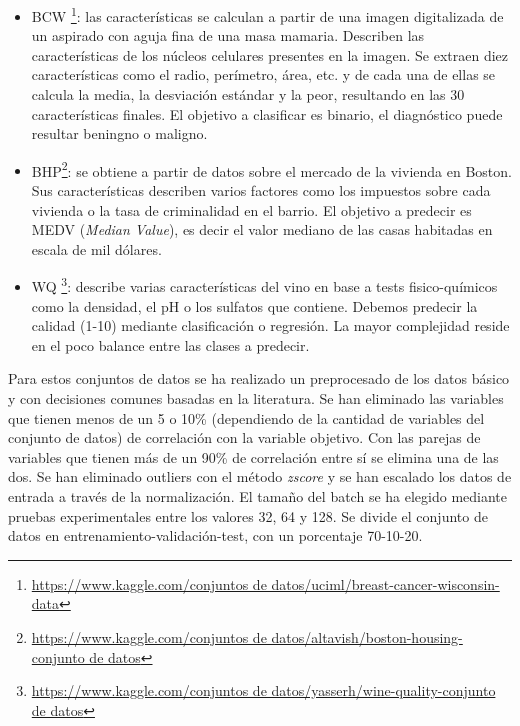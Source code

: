 \begin{itemize}

\item BCW \footnote{\url{https://www.kaggle.com/conjuntos de datos/uciml/breast-cancer-wisconsin-data}}: las características se calculan a partir de una imagen digitalizada de un aspirado con aguja fina de una masa mamaria. Describen las características de los núcleos celulares presentes en la imagen. Se extraen diez características como el radio, perímetro, área, etc. y de cada una de ellas se calcula la media, la desviación estándar y la peor, resultando en las 30 características finales. El objetivo a clasificar es binario, el diagnóstico puede resultar beningno o maligno. 

\item BHP\footnote{\url{https://www.kaggle.com/conjuntos de datos/altavish/boston-housing-conjunto de datos}}: se obtiene a partir de datos sobre el mercado de la vivienda en Boston. Sus características describen varios factores como los impuestos sobre cada vivienda o la tasa de criminalidad en el barrio. El objetivo a predecir es MEDV (\textit{Median Value}), es decir el valor mediano de las casas habitadas en escala de mil dólares.

\item WQ \footnote{\url{https://www.kaggle.com/conjuntos de datos/yasserh/wine-quality-conjunto de datos}}: describe varias características del vino en base a tests fisico-químicos como la densidad, el pH o los sulfatos que contiene. Debemos predecir la calidad (1-10) mediante clasificación o regresión. La mayor complejidad reside en el poco balance entre las clases a predecir.

\end{itemize}

Para estos conjuntos de datos se ha realizado un preprocesado de los datos básico y con decisiones comunes basadas en la literatura. Se han eliminado las variables que tienen menos de un 5 o 10\% (dependiendo de la cantidad de variables del conjunto de datos) de correlación con la variable objetivo. Con las parejas de variables que tienen más de un 90\% de correlación entre sí se elimina una de las dos. Se han eliminado outliers con el método \textit{zscore} y se han escalado los datos de entrada a través de la normalización. El tamaño del batch se ha elegido mediante pruebas experimentales entre los valores 32, 64 y 128. Se divide el conjunto de datos en entrenamiento-validación-test, con un porcentaje 70-10-20. 



